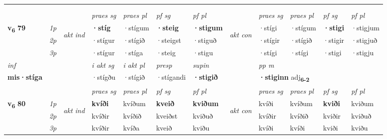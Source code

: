 \begin{longtable}[l]{X>{\footnotesize\itshape}llXXXXlXXXX}
\midrule

   & \\*
  & \\
   \midrule
 & &   & \textit{praes sg}  & \textit{praes pl}    & \textit{ pf sg} & \textit{pf pl} & & \textit{praes sg}  & \textit{praes pl}    & \textit{pf sg} & \textit{pf pl }  \\ \cmidrule{4-7} \cmidrule{9-12}
 \multirow{2}{*}{{{\textbf{v{\textsubscript{6}}} \Large{\textbf{79}}}}}  & 1p & \multirow{3}{*}{\begin{turn}{90}\textit{akt ind}\end{turn}} & \textbf{·stíg} & ·stígum & \textbf{·steig} & \textbf{·stigum} & \multirow{3}{*}{\begin{turn}{90}\textit{akt con}\end{turn}} &·stígi & ·stígum & \textbf{·stigi} & ·stigjum\\*
 & 2p &  &  ·stígur  & ·stígið & ·steigst & ·stiguð & & ·stígir & ·stígið & ·stigir & ·stigjuð \\*
 & 3p &  & ·stígur & ·stíga & ·steig & ·stigu & & ·stígi & ·stígi& ·stigi & ·stigju \\*
\cmidrule{4-7} \cmidrule{9-12}

   {\textit{inf}} & &  & \textit{i akt sg} & \textit{i akt pl}   & \textit{presp} & \textit{supin}  && \textit{pp m} \\*
  {\textbf{mis\allowbreak ·stíga}} & && ·stígðu  & ·stígið   & ·stígandi &  \textbf{·stigið}  && \multicolumn{2}{l}{\textbf{·stiginn} adj\textbf{\textsubscript{6-2}}} \\*

\midrule

 & &   & \textit{praes sg}  & \textit{praes pl}    & \textit{ pf sg} & \textit{pf pl} & & \textit{praes sg}  & \textit{praes pl}    & \textit{pf sg} & \textit{pf pl }  \\ \cmidrule{4-7} \cmidrule{9-12}
 \multirow{2}{*}{{{\textbf{v{\textsubscript{6}}} \Large{\textbf{80}}}}}  & 1p & \multirow{3}{*}{\begin{turn}{90}\textit{akt ind}\end{turn}} & \textbf{kvíði} & kvíðum & \textbf{kveið} & \textbf{kviðum} & \multirow{3}{*}{\begin{turn}{90}\textit{akt con}\end{turn}} &kvíði & kvíðum & \textbf{kviði} & kviðum\\*
 & 2p &  &  kvíðir  & kvíðið & kveiðst & kviðuð & & kvíðir & kvíðið & kviðir & kviðuð \\*
 & 3p &  & kvíðir & kvíða & kveið & kviðu & & kvíði & kvíði& kviði & kviðu \\*
\cmidrule{4-7} \cmidrule{9-12}


\end{longtable}
